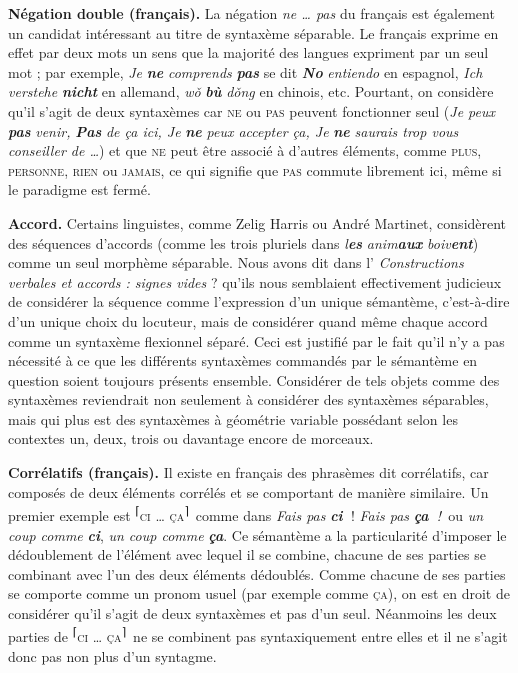 {    \textbf{Négation double (français).} La négation \textit{ne … pas} du français est également un candidat intéressant au titre de syntaxème séparable. Le français exprime en effet par deux mots un sens que la majorité des langues expriment par un seul mot ; par exemple, \textit{Je} \textbf{\textit{ne}} \textit{comprends} \textbf{\textit{pas}} se dit \textbf{\textit{No}} \textit{entiendo} en espagnol, \textit{Ich verstehe} \textbf{\textit{nicht}} en allemand, \textit{wǒ} \textbf{\textit{bù}} \textit{dǒng} en chinois, etc. Pourtant, on considère qu’il s’agit de deux syntaxèmes car \textsc{ne} ou \textsc{pas} peuvent fonctionner seul (\textit{Je peux} \textbf{\textit{pas}} \textit{venir,} \textbf{\textit{Pas}} \textit{de ça ici, Je} \textbf{\textit{ne}} \textit{peux accepter ça, Je} \textbf{\textit{ne}} \textit{saurais trop vous conseiller de …}) et que \textsc{ne} peut être associé à d’autres éléments, comme \textsc{plus,} \textsc{personne,} \textsc{rien} ou \textsc{jamais}, ce qui signifie que \textsc{pas} commute librement ici, même si le paradigme est fermé.

    \textbf{Accord.} Certains linguistes, comme Zelig Harris ou André Martinet, considèrent des séquences d’accords (comme les trois pluriels dans \textit{l}\textbf{\textit{es} }\textit{anim}\textbf{\textit{aux}} \textit{boiv}\textbf{\textit{ent}}) comme un seul morphème séparable. Nous avons dit dans l’ \textit{Constructions verbales et accords : signes vides} ? qu’ils nous semblaient effectivement judicieux de considérer la séquence comme l’expression d’un unique sémantème, c’est-à-dire d’un unique choix du locuteur, mais de considérer quand même chaque accord comme un syntaxème flexionnel séparé. Ceci est justifié par le fait qu’il n’y a pas nécessité à ce que les différents syntaxèmes commandés par le sémantème en question soient toujours présents ensemble. Considérer de tels objets comme des syntaxèmes reviendrait non seulement à considérer des syntaxèmes séparables, mais qui plus est des syntaxèmes à géométrie variable possédant selon les contextes un, deux, trois ou davantage encore de morceaux.

    \textbf{Corrélatifs (français).} Il existe en français des phrasèmes dit corrélatifs, car composés de deux éléments corrélés et se comportant de manière similaire. Un premier exemple est \textrm{\textsuperscript{⌈}}\textsc{ci} \textsc{…} \textsc{ça}\textrm{\textsuperscript{⌉}}~comme dans \textit{Fais pas} \textbf{\textit{ci~}}! \textit{Fais pas} \textbf{\textit{ça~}}\textit{!~}ou \textit{un coup comme} \textbf{\textit{ci}}, \textit{un coup comme} \textbf{\textit{ça}}. Ce sémantème a la particularité d’imposer le dédoublement de l’élément avec lequel il se combine, chacune de ses parties se combinant avec l’un des deux éléments dédoublés. Comme chacune de ses parties se comporte comme un pronom usuel (par exemple comme \textsc{ça}), on est en droit de considérer qu’il s’agit de deux syntaxèmes et pas d’un seul. Néanmoins les deux parties de \textrm{\textsuperscript{⌈}}\textsc{ci} \textsc{…} \textsc{ça}\textrm{\textsuperscript{⌉}}~ne se combinent pas syntaxiquement entre elles et il ne s’agit donc pas non plus d’un syntagme.

}
